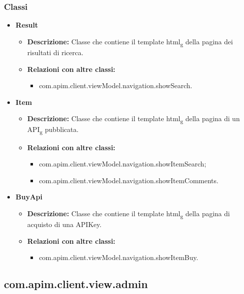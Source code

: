 {{		\subsubsection{Classi}{
			\begin{itemize}
				\item \textbf{Result}
					\begin{itemize}
						\item \textbf{Descrizione:} Classe che contiene il template html\textsubscript{g} della pagina dei risultati di ricerca.
						\item \textbf{Relazioni con altre classi:}
							\begin{itemize}
								\item com.apim.client.viewModel.navigation.showSearch.
							\end{itemize}
					\end{itemize}
				\item \textbf{Item}
					\begin{itemize}
						\item \textbf{Descrizione:} Classe che contiene il template html\textsubscript{g} della pagina di un API\textsubscript{g} pubblicata.
						\item \textbf{Relazioni con altre classi:}
							\begin{itemize}
								\item com.apim.client.viewModel.navigation.showItemSearch;
								\item com.apim.client.viewModel.navigation.showItemComments.
							\end{itemize}
					\end{itemize}	
				\item \textbf{BuyApi}
					\begin{itemize}
						\item \textbf{Descrizione:} Classe che contiene il template html\textsubscript{g} della pagina di acquisto di una APIKey.
						\item \textbf{Relazioni con altre classi:}
						\begin{itemize}
							\item com.apim.client.viewModel.navigation.showItemBuy.
						\end{itemize}
					\end{itemize}	
			\end{itemize}
		}
	}
	\subsection{com.apim.client.view.admin}{
}}
